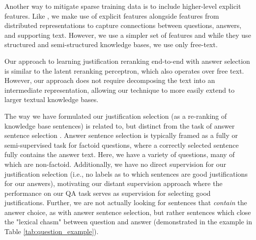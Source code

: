 Another way to mitigate sparse training data is to include higher-level explicit features.  Like \citet{sachan2016science}, we make use of explicit features alongside features from distributed representations to capture connections between questions, answers, and supporting text.  However, we use a simpler set of features and while they use structured and semi-structured knowledge bases, we use only free-text.  %

Our approach to learning justification reranking end-to-end with answer selection is similar to the \citet{jansen2017framing} latent reranking perceptron,  which also operates over free text.  However, our approach does not require decomposing the text into an intermediate representation, allowing our technique to more easily extend to larger textual knowledge bases.  

The way we have formulated our justification selection (as a re-ranking of knowledge base sentences) is related to, but distinct from the task of answer sentence selection \cite[][inter alia]{Wang2010ProbabilisticTM, Severyn:12,Severyn:13a,Severyn:13b,Severyn2015LearningTR,wang2015long}.  Answer sentence selection is typically framed as a fully or semi-supervised task for factoid questions, where a correctly selected sentence fully contains the answer text.
Here, we have a variety of questions, many of which are non-factoid.  Additionally, we have no direct supervision for our justification selection (i.e., no labels as to which sentences are good justifications for our answers), motivating our distant supervision approach where the performance on our QA task serves as supervision for selecting good justifications.  Further, we are not actually looking for sentences that \emph{contain} the answer choice, as with answer sentence selection, but rather sentences which close the "lexical chasm" \cite{Berger:00} between question and answer (demonstrated in the example in Table \ref{tab:question_example}). 


